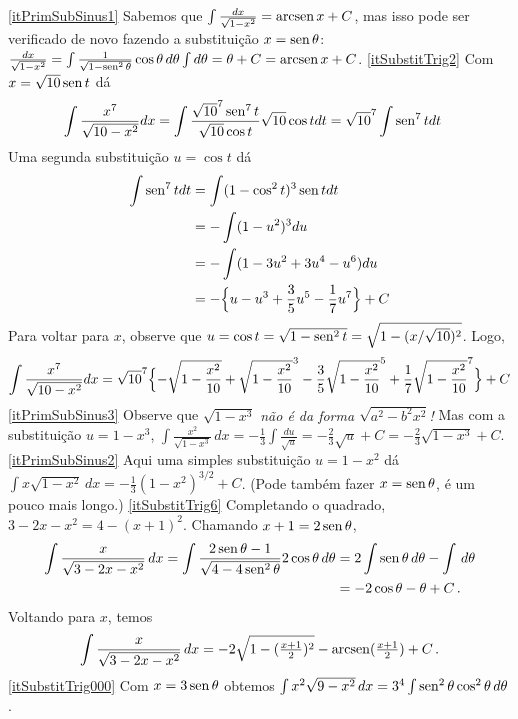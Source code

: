 \begin{Solution}{9.30}
\eqref{itPrimSubSinus1}
Sabemos que $\int \frac{dx}{\sqrt{1-x^2}}=\operatorname{arcsen} x+C$, mas isso pode ser
verificado de novo fazendo a substituição $x=\operatorname{sen} \theta$:
$\frac{dx}{\sqrt{1-x^2}}=\int\frac{1}{\sqrt{1-\operatorname{sen}^2\theta}}\cos\theta\,
d\theta\int d\theta=\theta+C=\operatorname{arcsen} x+C$.
\eqref{itSubstitTrig2} Com $x=\sqrt{10}\operatorname{sen} t$ dá
\begin{align*}
\int\frac{x^7}{\sqrt{10-x^2}}dx=\int\frac{\sqrt{10}^7\operatorname{sen}^7t}{\sqrt{10}\cos
t}\sqrt{10}\cos tdt
&=\sqrt{10}^7\int \operatorname{sen}^7tdt
\end{align*}
Uma segunda substituição $u=\cos t$ dá
\begin{align*}
\int \operatorname{sen}^7tdt&=\int (1-\cos^2t)^3\operatorname{sen} tdt\\
\quad&=-\int(1-u^2)^3du\\
&=-\int(1-3u^2+3u^4-u^6)du \\
&=-\Big\{u-u^3+\frac{3}{5}u^5-\frac{1}{7}u^7\Big\}+C
\end{align*}
Para voltar para $x$, observe que $u=\cos
t=\sqrt{1-\operatorname{sen}^2t}=\sqrt{1-(x/\sqrt{10})^2}$.
Logo,
$$
\int\frac{x^7}{\sqrt{10-x^2}}dx=\sqrt{10}^7\Bigl\{-\sqrt{1-\frac{x^2}{10}}
+\sqrt{1-\frac{x^2}{10}}^3-\frac{3}{5}\sqrt{1-\frac{x^2}{10}}^5
+\frac{1}{7}\sqrt{1-\frac{x^2}{10}}^7\Bigr\}+C
$$
\eqref{itPrimSubSinus3} Observe que $\sqrt{1-x^3}$ \emph{não é da forma
$\sqrt{a^2-b^2x^2}$!} Mas com a substituição $u=1-x^3$,
$\int \frac{x^2}{\sqrt{1-x^3}}\,dx=-\tfrac13\int
\frac{du}{\sqrt{u}}=-\tfrac23\sqrt{u}+C=-\tfrac23\sqrt{1-x^3}+C$.
\eqref{itPrimSubSinus2} Aqui uma simples substituição $u=1-x^2$ dá
$\int x\sqrt{1-x^2}\,dx=-\tfrac13(1-x^2)^{3/2}+C$. (Pode também fazer $x=\operatorname{sen}
\theta$, é um pouco mais longo.)
\eqref{itSubstitTrig6} Completando o quadrado,
$3-2x-x^2=4-(x+1)^2$. Chamando $x+1=2\operatorname{sen} \theta$,
\begin{align*}
\int\frac{x}{\sqrt{3-2x-x^2}}\,dx=\int\frac{2\operatorname{sen}
\theta-1}{\sqrt{4-4\operatorname{sen}^2\theta}}2\cos \theta\,d\theta&=
2\int \operatorname{sen} \theta\,d\theta-\int \,d\theta\\
&=-2\cos\theta-\theta+C\,.
\end{align*}
Voltando para $x$, temos
$$
\int\frac{x}{\sqrt{3-2x-x^2}}\,dx=-2\sqrt{1-(\tfrac{x+1}{2})^2}
-\operatorname{arcsen}(\tfrac{x+1}{2})+C\,.$$
\eqref{itSubstitTrig000} Com $x=3\operatorname{sen} \theta$ obtemos
$\int x^2{\sqrt{9-x^2}}\,dx=3^4\int \operatorname{sen}^2\theta\cos^2\theta\,d\theta$.
\end{Solution}
